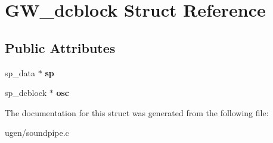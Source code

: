 \hypertarget{structGW__dcblock}{}\section{G\+W\+\_\+dcblock Struct Reference}
\label{structGW__dcblock}
\subsection*{Public Attributes}
\begin{DoxyCompactItemize}
\item 
\hypertarget{structGW__dcblock_a144bc8f0e828b45f0141166a15449aa6}{}\label{structGW__dcblock_a144bc8f0e828b45f0141166a15449aa6} 
sp\+\_\+data $\ast$ {\bfseries sp}
\item 
\hypertarget{structGW__dcblock_a6ca32763c43d77970134205dfd32e942}{}\label{structGW__dcblock_a6ca32763c43d77970134205dfd32e942} 
sp\+\_\+dcblock $\ast$ {\bfseries osc}
\end{DoxyCompactItemize}


The documentation for this struct was generated from the following file\+:\begin{DoxyCompactItemize}
\item 
ugen/soundpipe.\+c\end{DoxyCompactItemize}
